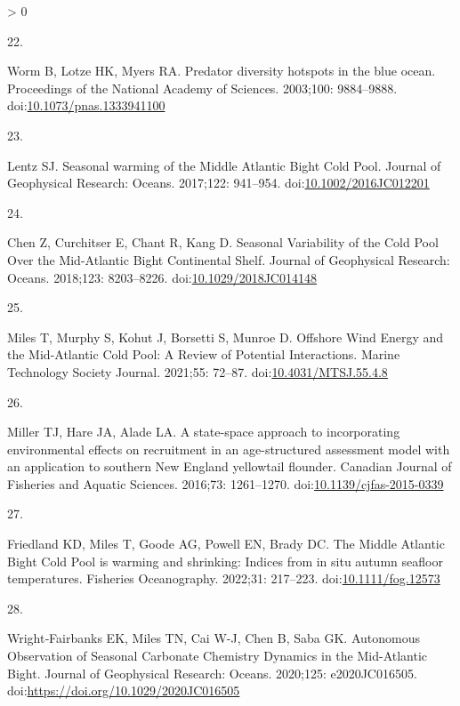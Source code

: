 \documentclass[
  10pt,
]{article}
\newlength{\cslhangindent}
\newlength{\csllabelwidth}
\newenvironment{CSLReferences}[2] %
 {%
  \setlength{\parindent}{0pt}
  \ifodd #1 \everypar{\setlength{\hangindent}{\cslhangindent}}\ignorespaces\fi
  \ifnum #2 > 0
  \setlength{\parskip}{#2\baselineskip}
  \fi
 }%
 {}
\newcommand{\CSLLeftMargin}[1]{\parbox[t]{\csllabelwidth}{#1}}
\newcommand{\CSLRightInline}[1]{\parbox[t]{\linewidth - \csllabelwidth}{#1}\break}
\begin{document}
\begin{CSLReferences}{0}{0}
\leavevmode\hypertarget{ref-worm_predator_2003}{}%
\CSLLeftMargin{22. }
\CSLRightInline{Worm B, Lotze HK, Myers RA. Predator diversity hotspots
in the blue ocean. Proceedings of the National Academy of Sciences.
2003;100: 9884--9888.
doi:\href{https://doi.org/10.1073/pnas.1333941100}{10.1073/pnas.1333941100}}

\leavevmode\hypertarget{ref-lentz_seasonal_2017}{}%
\CSLLeftMargin{23. }
\CSLRightInline{Lentz SJ. Seasonal warming of the {Middle} {Atlantic}
{Bight} {Cold} {Pool}. Journal of Geophysical Research: Oceans.
2017;122: 941--954.
doi:\href{https://doi.org/10.1002/2016JC012201}{10.1002/2016JC012201}}

\leavevmode\hypertarget{ref-chen_seasonal_2018}{}%
\CSLLeftMargin{24. }
\CSLRightInline{Chen Z, Curchitser E, Chant R, Kang D. Seasonal
{Variability} of the {Cold} {Pool} {Over} the {Mid}-{Atlantic} {Bight}
{Continental} {Shelf}. Journal of Geophysical Research: Oceans.
2018;123: 8203--8226.
doi:\href{https://doi.org/10.1029/2018JC014148}{10.1029/2018JC014148}}

\leavevmode\hypertarget{ref-miles_offshore_2021}{}%
\CSLLeftMargin{25. }
\CSLRightInline{Miles T, Murphy S, Kohut J, Borsetti S, Munroe D.
Offshore {Wind} {Energy} and the {Mid}-{Atlantic} {Cold} {Pool}: {A}
{Review} of {Potential} {Interactions}. Marine Technology Society
Journal. 2021;55: 72--87.
doi:\href{https://doi.org/10.4031/MTSJ.55.4.8}{10.4031/MTSJ.55.4.8}}

\leavevmode\hypertarget{ref-miller_state-space_2016}{}%
\CSLLeftMargin{26. }
\CSLRightInline{Miller TJ, Hare JA, Alade LA. A state-space approach to
incorporating environmental effects on recruitment in an age-structured
assessment model with an application to southern {New} {England}
yellowtail flounder. Canadian Journal of Fisheries and Aquatic Sciences.
2016;73: 1261--1270.
doi:\href{https://doi.org/10.1139/cjfas-2015-0339}{10.1139/cjfas-2015-0339}}

\leavevmode\hypertarget{ref-friedland_middle_2022}{}%
\CSLLeftMargin{27. }
\CSLRightInline{Friedland KD, Miles T, Goode AG, Powell EN, Brady DC.
The {Middle} {Atlantic} {Bight} {Cold} {Pool} is warming and shrinking:
{Indices} from in situ autumn seafloor temperatures. Fisheries
Oceanography. 2022;31: 217--223.
doi:\href{https://doi.org/10.1111/fog.12573}{10.1111/fog.12573}}

\leavevmode\hypertarget{ref-wrightfairbanks_autonomous_2020}{}%
\CSLLeftMargin{28. }
\CSLRightInline{Wright‐Fairbanks EK, Miles TN, Cai W-J, Chen B, Saba GK.
Autonomous {Observation} of {Seasonal} {Carbonate} {Chemistry}
{Dynamics} in the {Mid}-{Atlantic} {Bight}. Journal of Geophysical
Research: Oceans. 2020;125: e2020JC016505.
doi:\url{https://doi.org/10.1029/2020JC016505}}


\end{CSLReferences}
\end{document}
